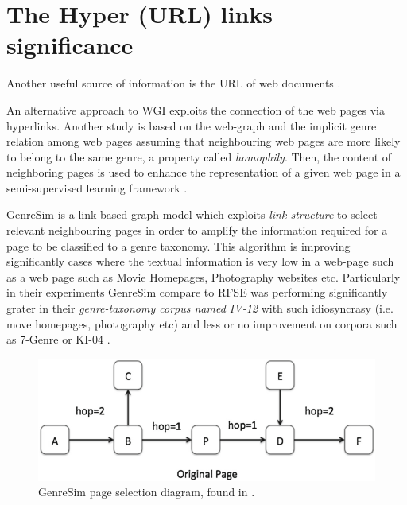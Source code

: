 \section{The Hyper (URL) links significance}\label{chap:relevant_work:sec:intro}

 Another useful source of information is the URL of web documents  \parencite{abramson2012_URL,jebari2014pure_URL,priyatam2013don_URL}.

An alternative approach to WGI exploits the connection of the web pages via hyperlinks. 
Another study is based on the web-graph and the implicit genre relation among web pages assuming that neighbouring web pages are more likely to belong to the same genre, a property called \textit{homophily}. Then, the content of neighboring pages is used to enhance the representation of a given web page in a semi-supervised learning framework \parencite{asheghi2014semi}.

GenreSim is a link-based graph model which exploits \textit{link structure} to select relevant neighbouring pages in order to amplify the information required for a page to be classified to a genre taxonomy. This algorithm is improving significantly cases where the textual information is very low in a web-page such as a web page such as Movie Homepages, Photography websites etc. Particularly in their experiments GenreSim compare to RFSE was performing significantly grater in their \textit{genre-taxonomy corpus named IV-12} with such idiosyncrasy (i.e. move homepages, photography etc) and less or no improvement on corpora such as 7-Genre or KI-04 \parencite{zhu2011enhance,zhu2016exploiting}.

\begin{figure}[t]
	\begin{center}
    	\includegraphics[scale=0.95]{Figures/GenreSim_Draw.eps}
		\caption{GenreSim page selection diagram, found in  \parencite{zhu2016exploiting}.}
		\label{fiig:GenreSim_Draw}
	\end{center}
\end{figure}

